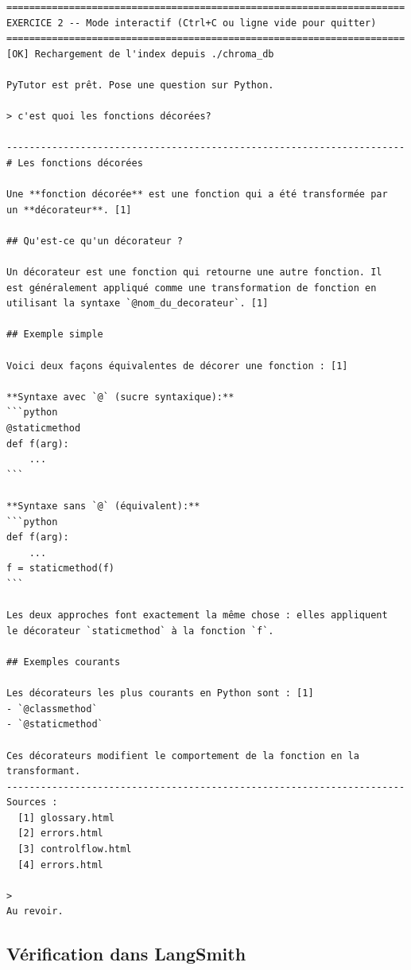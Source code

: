 \documentclass[11pt,a4paper]{article}
\begin{document}
\begin{tcolorbox}[
  colback=white,
  colframe=black!50,
  coltitle=black,
  fonttitle=\footnotesize\bfseries,
  fontupper=\footnotesize,
  title=Sortie de l'exécution,
  breakable,
]
\begin{verbatim}
======================================================================
EXERCICE 2 -- Mode interactif (Ctrl+C ou ligne vide pour quitter)
======================================================================
[OK] Rechargement de l'index depuis ./chroma_db

PyTutor est prêt. Pose une question sur Python.

> c'est quoi les fonctions décorées?

----------------------------------------------------------------------
# Les fonctions décorées

Une **fonction décorée** est une fonction qui a été transformée par
un **décorateur**. [1]

## Qu'est-ce qu'un décorateur ?

Un décorateur est une fonction qui retourne une autre fonction. Il
est généralement appliqué comme une transformation de fonction en
utilisant la syntaxe `@nom_du_decorateur`. [1]

## Exemple simple

Voici deux façons équivalentes de décorer une fonction : [1]

**Syntaxe avec `@` (sucre syntaxique):**
```python
@staticmethod
def f(arg):
    ...
```

**Syntaxe sans `@` (équivalent):**
```python
def f(arg):
    ...
f = staticmethod(f)
```

Les deux approches font exactement la même chose : elles appliquent
le décorateur `staticmethod` à la fonction `f`.

## Exemples courants

Les décorateurs les plus courants en Python sont : [1]
- `@classmethod`
- `@staticmethod`

Ces décorateurs modifient le comportement de la fonction en la
transformant.
----------------------------------------------------------------------
Sources :
  [1] glossary.html
  [2] errors.html
  [3] controlflow.html
  [4] errors.html

>
Au revoir.
\end{verbatim}
\end{tcolorbox}

\subsection{Vérification dans LangSmith}
\end{document}
